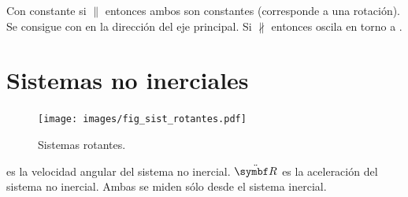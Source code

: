 \documentclass[10pt,oneside]{CBFT_book}
\begin{document}
Con  constante si $\parallel$ \vb{\Omega} entonces ambos son constantes (corresponde a una rotación). Se consigue 
con \vb{\Omega} en la dirección del eje principal. Si $\nparallel$ \vb{\Omega} entonces \vb{\Omega} oscila en torno a
.



\section{Sistemas no inerciales}


\begin{figure}[!h]
	\begin{center}
	\texttt{[image: images/fig\_sist\_rotantes.pdf]}	 
	\end{center}
	\caption{Sistemas rotantes.}
\end{figure} 

\vb{\Omega} es la velocidad angular del sistema no inercial. $\ddot{\vb{R}}$ es la aceleración del 
sistema no inercial. Ambas se miden sólo desde el sistema inercial.
\end{document}

